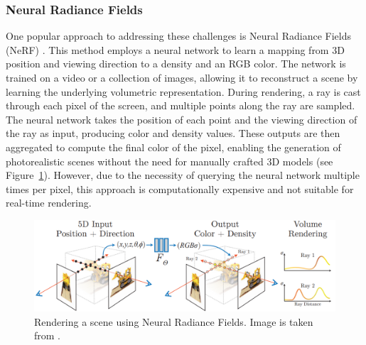\documentclass[12pt]{article}
\begin{document}
\subsubsection{Neural Radiance Fields}
One popular approach to addressing these challenges is Neural Radiance Fields (NeRF) \parencite{Nerf}. This method employs a neural network to learn a mapping from 3D position and viewing direction to a density and an RGB color. The network is trained on a video or a collection of images, allowing it to reconstruct a scene by learning the underlying volumetric representation. During rendering, a ray is cast through each pixel of the screen, and multiple points along the ray are sampled. The neural network takes the position of each point and the viewing direction of the ray as input, producing color and density values. These outputs are then aggregated to compute the final color of the pixel, enabling the generation of photorealistic scenes without the need for manually crafted 3D models (see Figure~\ref{fig:nerf}). However, due to the necessity of querying the neural network multiple times per pixel, this approach is computationally expensive and not suitable for real-time rendering.
\begin{figure}[h!]
	\centering
	\includegraphics[width=\textwidth]{Images/Nerf.png}
	\caption{Rendering a scene using Neural Radiance Fields. Image is taken from \cite{Nerf}.}
	\label{fig:nerf}
\end{figure}
\end{document}
